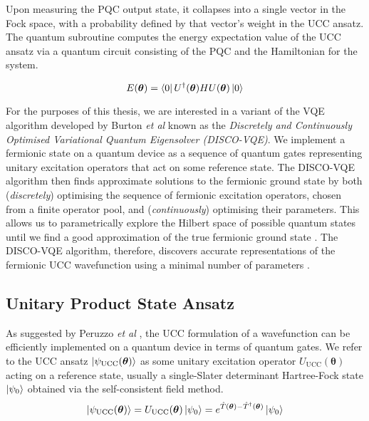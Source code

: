 Upon measuring the PQC output state, it collapses into a single vector in the Fock space, with a probability defined by that vector's weight in the UCC ansatz. The quantum subroutine computes the energy expectation value of the UCC ansatz via a quantum circuit consisting of the PQC and the Hamiltonian for the system.

\begin{equation*}
    E(\bm\theta) = \bra{0} U^\dagger(\bm\theta) H U(\bm\theta) \ket{0} 
\end{equation*}

For the purposes of this thesis, we are interested in a variant of the VQE algorithm developed by Burton \textit{et al} \cite{Burton2023} known as the \textit{Discretely and Continuously Optimised Variational Quantum Eigensolver (DISCO-VQE)}. We implement a fermionic state on a quantum device as a sequence of quantum gates representing unitary excitation operators that act on some reference state. The DISCO-VQE algorithm then finds approximate solutions to the fermionic ground state by both (\textit{discretely}) optimising the sequence of fermionic excitation operators, chosen from a finite operator pool, and (\textit{continuously}) optimising their parameters. This allows us to parametrically explore the Hilbert space of possible quantum states until we find a good approximation of the true fermionic ground state \cite{Taube2006}. The DISCO-VQE algorithm, therefore, discovers accurate representations of the fermionic UCC wavefunction using a minimal number of parameters \cite{Burton2023}.


\subsection{Unitary Product State Ansatz}%
\label{unitary-coupled-cluster-ansatz}

As suggested by Peruzzo \textit{et al} \cite{Peruzzo2014}, the UCC formulation of a wavefunction can be efficiently implemented on a quantum device in terms of quantum gates. We refer to the UCC ansatz $\ket{\psi_{\text{UCC}}(\bm\theta)}$ as some unitary excitation operator $U_\text{UCC}(\bm\theta)$ acting on a reference state, usually a single-Slater determinant Hartree-Fock state $\ket{\psi_0}$ obtained via the self-consistent field method.
\begin{equation*}
    \ket{\psi_{\text{UCC}}(\bm\theta)} = U_\text{UCC}(\bm\theta) \ket{\psi_0} =
    e^{\hat T(\bm\theta) - \hat T^\dagger(\bm\theta)} \ket{\psi_0}
\end{equation*}

